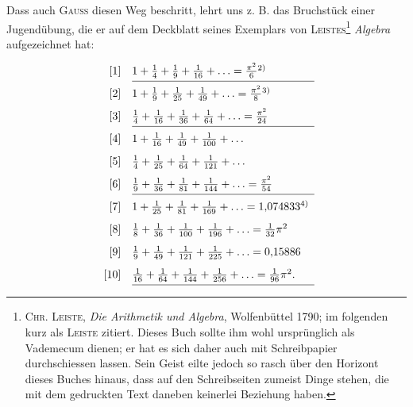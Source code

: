 Dass auch \textsc{Gauss} diesen Weg beschritt, lehrt uns z. B. das Bruchstück
einer Jugendübung, die er auf dem Deckblatt seines Exemplars von \textsc{Leistes}\footnote{\textsc{Chr. Leiste}, \textit{Die Arithmetik und Algebra}, Wolfenbüttel 1790; im folgenden kurz als \textsc{Leiste} zitiert. Dieses Buch sollte ihm wohl ursprünglich als Vademecum dienen; er hat es sich daher auch mit Schreibpapier durchschiessen lassen. Sein Geist eilte jedoch so rasch über den Horizont dieses Buches hinaus, dass auf den Schreibseiten zumeist Dinge stehen, die mit dem gedruckten Text daneben keinerlei Beziehung haben.}
\textit{Algebra} aufgezeichnet hat:
\[
\renewcommand{\arraystretch}{1.7}
\begin{array}{r@{\quad}l}
[1]&1+\frac{1}{4}+\frac{1}{9}+\frac{1}{16}+\ldots=\frac{\pi^2}{6}\text{\textsuperscript{2)}}\\\cline{2-2}
{}[2]&1+\frac{1}{9}+\frac{1}{25}+\frac{1}{49}+\ldots=\frac{\pi^2}{8}\text{\textsuperscript{3)}}\\
{}[3]&\frac{1}{4}+\frac{1}{16}+\frac{1}{36}+\frac{1}{64}+\ldots=\frac{\pi^2}{24}\\\cline{2-2}
{}[4]&1+\frac{1}{16}+\frac{1}{49}+\frac{1}{100}+\ldots\\
{}[5]&\frac{1}{4}+\frac{1}{25}+\frac{1}{64}+\frac{1}{121}+\ldots\\
{}[6]&\frac{1}{9}+\frac{1}{36}+\frac{1}{81}+\frac{1}{144}+\ldots=\frac{\pi^2}{54}\\\cline{2-2}
{}[7]&1+\frac{1}{25}+\frac{1}{81}+\frac{1}{169}+\ldots=1{,}074833\text{\textsuperscript{4)}}\\
{}[8]&\frac{1}{8}+\frac{1}{36}+\frac{1}{100}+\frac{1}{196}+\ldots=\frac{1}{32}\pi^2\\
{}[9]&\frac{1}{9}+\frac{1}{49}+\frac{1}{121}+\frac{1}{225}+\ldots=0{,}15886\\
{}[10]&\frac{1}{16}+\frac{1}{64}+\frac{1}{144}+\frac{1}{256}+\ldots=\frac{1}{96}\pi^2.\\\cline{2-2}
\end{array}
\]
\setcounter{footnote}{2}
\setcounter{footnote}{3}
\setcounter{footnote}{4}
